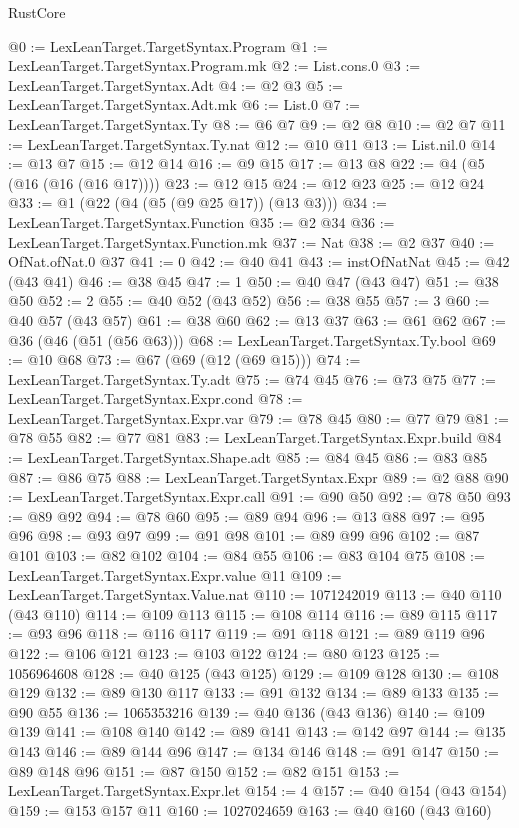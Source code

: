 \begin{lexlean}{RustCore}
\begin{coremodule}
@0 := LexLeanTarget.TargetSyntax.Program
@1 := LexLeanTarget.TargetSyntax.Program.mk
@2 := List.cons.{0}
@3 := LexLeanTarget.TargetSyntax.Adt
@4 := @2 @3
@5 := LexLeanTarget.TargetSyntax.Adt.mk
@6 := List.{0}
@7 := LexLeanTarget.TargetSyntax.Ty
@8 := @6 @7
@9 := @2 @8
@10 := @2 @7
@11 := LexLeanTarget.TargetSyntax.Ty.nat
@12 := @10 @11
@13 := List.nil.{0}
@14 := @13 @7
@15 := @12 @14
@16 := @9 @15
@17 := @13 @8
@22 := @4 (@5 (@16 (@16 (@16 @17))))
@23 := @12 @15
@24 := @12 @23
@25 := @12 @24
@33 := @1 (@22 (@4 (@5 (@9 @25 @17)) (@13 @3)))
@34 := LexLeanTarget.TargetSyntax.Function
@35 := @2 @34
@36 := LexLeanTarget.TargetSyntax.Function.mk
@37 := Nat
@38 := @2 @37
@40 := OfNat.ofNat.{0} @37
@41 := 0
@42 := @40 @41
@43 := instOfNatNat
@45 := @42 (@43 @41)
@46 := @38 @45
@47 := 1
@50 := @40 @47 (@43 @47)
@51 := @38 @50
@52 := 2
@55 := @40 @52 (@43 @52)
@56 := @38 @55
@57 := 3
@60 := @40 @57 (@43 @57)
@61 := @38 @60
@62 := @13 @37
@63 := @61 @62
@67 := @36 (@46 (@51 (@56 @63)))
@68 := LexLeanTarget.TargetSyntax.Ty.bool
@69 := @10 @68
@73 := @67 (@69 (@12 (@69 @15)))
@74 := LexLeanTarget.TargetSyntax.Ty.adt
@75 := @74 @45
@76 := @73 @75
@77 := LexLeanTarget.TargetSyntax.Expr.cond
@78 := LexLeanTarget.TargetSyntax.Expr.var
@79 := @78 @45
@80 := @77 @79
@81 := @78 @55
@82 := @77 @81
@83 := LexLeanTarget.TargetSyntax.Expr.build
@84 := LexLeanTarget.TargetSyntax.Shape.adt
@85 := @84 @45
@86 := @83 @85
@87 := @86 @75
@88 := LexLeanTarget.TargetSyntax.Expr
@89 := @2 @88
@90 := LexLeanTarget.TargetSyntax.Expr.call
@91 := @90 @50
@92 := @78 @50
@93 := @89 @92
@94 := @78 @60
@95 := @89 @94
@96 := @13 @88
@97 := @95 @96
@98 := @93 @97
@99 := @91 @98
@101 := @89 @99 @96
@102 := @87 @101
@103 := @82 @102
@104 := @84 @55
@106 := @83 @104 @75
@108 := LexLeanTarget.TargetSyntax.Expr.value @11
@109 := LexLeanTarget.TargetSyntax.Value.nat
@110 := 1071242019
@113 := @40 @110 (@43 @110)
@114 := @109 @113
@115 := @108 @114
@116 := @89 @115
@117 := @93 @96
@118 := @116 @117
@119 := @91 @118
@121 := @89 @119 @96
@122 := @106 @121
@123 := @103 @122
@124 := @80 @123
@125 := 1056964608
@128 := @40 @125 (@43 @125)
@129 := @109 @128
@130 := @108 @129
@132 := @89 @130 @117
@133 := @91 @132
@134 := @89 @133
@135 := @90 @55
@136 := 1065353216
@139 := @40 @136 (@43 @136)
@140 := @109 @139
@141 := @108 @140
@142 := @89 @141
@143 := @142 @97
@144 := @135 @143
@146 := @89 @144 @96
@147 := @134 @146
@148 := @91 @147
@150 := @89 @148 @96
@151 := @87 @150
@152 := @82 @151
@153 := LexLeanTarget.TargetSyntax.Expr.let
@154 := 4
@157 := @40 @154 (@43 @154)
@159 := @153 @157 @11
@160 := 1027024659
@163 := @40 @160 (@43 @160)

\end{coremodule}
\end{lexlean}

